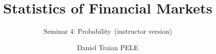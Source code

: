 \title[Statistics of Financial Markets]{Statistics of Financial Markets}
\subtitle{Seminar 4: Probability\ifsolutions\ (instructor version)\fi}
\author[D.T. Pele]{Daniel Traian PELE}
\date{}

\providecommand{\sfmapplink}[3]{\hypertarget{#2}{}\hyperlink{#1}{\beamergotobutton{#3}}}  %
\providecommand{\sfmappback}[2]{\begin{tikzpicture}[remember picture,overlay]\node[anchor=south east] at ([xshift=-3mm,yshift=7mm]current page.south east){\hyperlink{#1}{\beamerreturnbutton{#2}}};\end{tikzpicture}}  %
\providecommand{\sfmchlink}[2]{\href{#1}{#2}}  %
\providecommand{\sfmchlinkt}[2]{\href{#1}{\usebeamercolor[fg]{frametitle}#2}}  %


